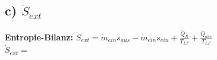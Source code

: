 \subsection*{c) $\dot{S}_{ext}$}
\textbf{Entropie-Bilanz:} $\dot{S}_{ext} = \dot{m}_{ein} s_{aus} - \dot{m}_{ein} s_{ein} + \frac{\dot{Q}_R}{T_{LF}} + \frac{\dot{Q}_{aus}}{T_{LF}}$ \\
$\dot{S}_{ext} =$